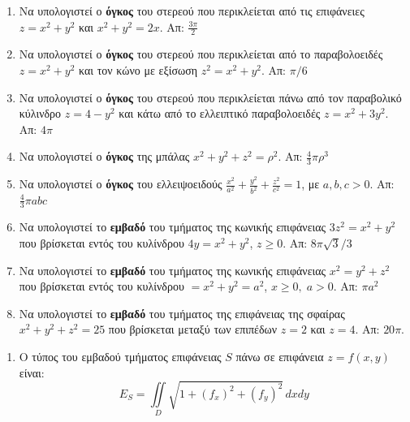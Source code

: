 \begin{enumerate}
  \item Να υπολογιστεί ο \textbf{όγκος} του στερεού που περικλείεται από τις 
    επιφάνειες $ z=x^{2}+y^{2} $ και $ x^{2}+y^{2}=2x $.
    \hfill Απ: $ \frac{3 \pi}{2} $ 

  \item Να υπολογιστεί ο \textbf{όγκος} του στερεού που περικλείεται από το 
    παραβολοειδές $ z = x^{2}+y^{2} $ και τον κώνο με εξίσωση $ z^{2}=x^{2}+y^{2} $.
    \hfill Απ: $ \pi/6 $ %

  \item Να υπολογιστεί ο \textbf{όγκος} του στερεού που περικλείεται πάνω από τον 
    παραβολικό κύλινδρο $ z=4-y^{2} $ και κάτω από το ελλειπτικό παραβολοειδές 
    $ z=x^{2}+3y^{2} $.  
    \hfill Απ: $ 4 \pi $  

  \item Να υπολογιστεί ο \textbf{όγκος} της μπάλας $ x^{2}+y^{2}+z^{2}=\rho^{2} $.
    \hfill Απ: $ \frac{4}{3} \pi \rho^{3} $ 

  \item Να υπολογιστεί ο \textbf{όγκος} του ελλειψοειδούς 
    $ \frac{x^{2}}{a^{2}} + \frac{y^{2}}{b^{2}} + \frac{z^{2}}{c^{2}} =1 $, με  
    $ a,b,c > 0 $.
    \hfill Απ: $ \frac{4}{3} \pi abc $ 

  \item Να υπολογιστεί το \textbf{εμβαδό} του τμήματος της κωνικής επιφάνειας 
    $ 3z^{2}=x^{2}+y^{2} $ που βρίσκεται εντός του κυλίνδρου 
    $ 4y=x^{2}+y^{2} $, $ z \geq 0 $. \hfill Απ: $ 8 \pi \sqrt{3}/{3} $ 

  \item Να υπολογιστεί το \textbf{εμβαδό} του τμήματος της κωνικής επιφάνειας 
    $ x^{2}=y^{2}+z^{2} $ που βρίσκεται εντός του κυλίνδρου 
    $ =x^{2}+y^{2} = a^{2} $, $ x \geq 0,\; a > 0 $. 
    \hfill Απ: $ \pi a^{2}$ %

  \item Να υπολογιστεί το \textbf{εμβαδό} του τμήματος της επιφάνειας της σφαίρας
    $x^{2} + y^{2}+z^{2}=25 $ που βρίσκεται μεταξύ των επιπέδων $ z=2 $ και $ z=4 $.
    \hfill Απ: $ 20 \pi $.  %
\end{enumerate}


\vspace{\baselineskip}

\begin{center}
  \minibox{\large\bf \textcolor{Col1}{Υποδείξεις}}
\end{center}

\vspace{\baselineskip}

\begin{enumerate}
  \item Ο τύπος του εμβαδού τμήματος επιφάνειας $S$ πάνω σε επιφάνεια $ z=f(x,y) $ 
    είναι: 
    \[
      E_{S}=\iint\limits_{D} \sqrt{1 + (f_{x})^{2}+(f_{y})^{2}} \,dxdy
    \]
\end{enumerate}




